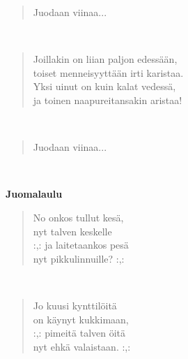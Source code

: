 \noindent\begin{minipage}{\linewidth}
\begin{verse}
	Juodaan viinaa...\\
\end{verse}
\end{minipage}\\[10pt]
\noindent\begin{minipage}{\linewidth}
\begin{verse}
	Joillakin on liian paljon edessään,\\
	toiset menneisyyttään irti karistaa.\\
	Yksi uinut on kuin kalat vedessä,\\
	ja toinen naapureitansakin aristaa!\\
\end{verse}
\end{minipage}\\[10pt]
\noindent\begin{minipage}{\linewidth}
\begin{verse}
	Juodaan viinaa...\\
\end{verse}
\end{minipage}\\[10pt]
%
%
\noindent\begin{minipage}{\linewidth}
\vspace{5pt}
\parbox[t]{0.85\linewidth}{\raggedright {\large\bf Juomalaulu}\\[6pt]}
\begin{verse}
	No onkos tullut kesä,\\
	nyt talven keskelle\\
	\hspace{0pt-\widthof{:,: }}:,: ja laitetaankos pesä\\
	nyt pikkulinnuille? :,:\\
\end{verse}
\end{minipage}\\[10pt]
\noindent\begin{minipage}{\linewidth}
\begin{verse}
	Jo kuusi kynttilöitä\\
	on käynyt kukkimaan,\\
	\hspace{0pt-\widthof{:,: }}:,: pimeitä talven öitä\\
	nyt ehkä valaistaan. :,:\\
\end{verse}
\end{minipage}\\[10pt]
